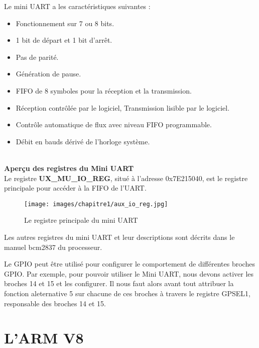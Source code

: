 \documentclass[12pt,a4paper,oneside]{book}
\begin{document}
	Le mini UART a les caractéristiques suivantes :
	\begin{itemize}
		\item Fonctionnement sur 7 ou 8 bits.\\ 
		\item 1 bit de départ et 1 bit d'arrêt.\\ 
		\item Pas de parité. \\
		\item Génération de pause.\\ 
		\item FIFO de 8 symboles pour la réception et la transmission. \\
		\item Réception contrôlée par le logiciel, Transmission lisible par le logiciel.\\
		\item Contrôle automatique de flux avec niveau FIFO programmable. \\
		\item Débit en bauds dérivé de l'horloge système.\\ \\
	\end{itemize}
	
	\textbf{Aperçu des registres du Mini UART}\\
	Le registre \textbf{UX\_MU\_IO\_REG}, situé à l'adresse 0x7E215040, est le registre principale pour accéder à la FIFO de l'UART.\\
	\begin{figure}[H]
			\centering
			\texttt{[image: images/chapitre1/aux\_io\_reg.jpg]}
			\caption{Le registre principale du mini UART}
			\label{Types}
	\end{figure}
	Les autres registres du mini UART et leur descriptions sont décrits dans le manuel bcm2837 du processeur.
	
	Le GPIO peut être utilisé pour configurer le comportement de différentes broches GPIO. Par exemple, pour pouvoir utiliser le Mini UART, nous devons activer les broches 14 et 15 et les configurer. Il nous faut alors avant tout attribuer la fonction aleternative 5 sur chacune de ces broches à travers le registre GPSEL1, responsable des broches 14 et 15.
	
	\chapter{L'ARM V8}
	
\end{document}
